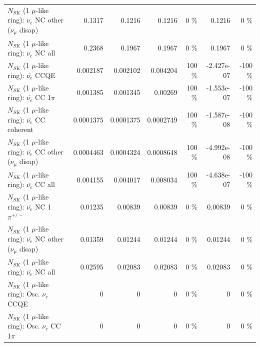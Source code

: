 \begin{table}
\begin{tabular}{| l | r | r | r  r | r  r |}
                $N_{SK}$ (1 $\mu$-like ring): $\nu_e$ NC other ($\nu_\mu$ disap) &          0.1317 &          0.1216 &          0.1216 &        0 \%  &          0.1216 &        0 \%  \\ 
                                  $N_{SK}$ (1 $\mu$-like ring): $\nu_{e}$ NC all &          0.2368 &          0.1967 &          0.1967 &        0 \%  &          0.1967 &        0 \%  \\ 
\hline
\hline
\hline
                                $N_{SK}$ (1 $\mu$-like ring): $\bar{\nu_e}$ CCQE &        0.002187 &        0.002102 &        0.004204 &      100 \%  &      -2.427e-07 &     -100 \%  \\ 
                           $N_{SK}$ (1 $\mu$-like ring): $\bar{\nu_e}$ CC 1$\pi$ &        0.001385 &        0.001345 &         0.00269 &      100 \%  &      -1.553e-07 &     -100 \%  \\ 
                         $N_{SK}$ (1 $\mu$-like ring): $\bar{\nu_e}$ CC coherent &       0.0001375 &       0.0001375 &       0.0002749 &      100 \%  &      -1.587e-08 &     -100 \%  \\ 
          $N_{SK}$ (1 $\mu$-like ring): $\bar{\nu_e}$ CC other ($\nu_\mu$ disap) &       0.0004463 &       0.0004324 &       0.0008648 &      100 \%  &      -4.992e-08 &     -100 \%  \\ 
                            $N_{SK}$ (1 $\mu$-like ring): $\bar{\nu_{e}}$ CC all &        0.004155 &        0.004017 &        0.008034 &      100 \%  &      -4.638e-07 &     -100 \%  \\ 
\hline
                     $N_{SK}$ (1 $\mu$-like ring): $\bar{\nu_e}$ NC 1$\pi^{+/-}$ &         0.01235 &         0.00839 &         0.00839 &        0 \%  &         0.00839 &        0 \%  \\ 
          $N_{SK}$ (1 $\mu$-like ring): $\bar{\nu_e}$ NC other ($\nu_\mu$ disap) &         0.01359 &         0.01244 &         0.01244 &        0 \%  &         0.01244 &        0 \%  \\ 
                            $N_{SK}$ (1 $\mu$-like ring): $\bar{\nu_{e}}$ NC all &         0.02595 &         0.02083 &         0.02083 &        0 \%  &         0.02083 &        0 \%  \\ 
\hline
\hline
\hline
                                 $N_{SK}$ (1 $\mu$-like ring): Osc. $\nu_e$ CCQE &               0 &               0 &               0 &        0 \%  &               0 &        0 \%  \\ 
                            $N_{SK}$ (1 $\mu$-like ring): Osc. $\nu_e$ CC 1$\pi$ &               0 &               0 &               0 &        0 \%  &               0 &        0 \%  \\ 

\end{tabular}
\end{table}
